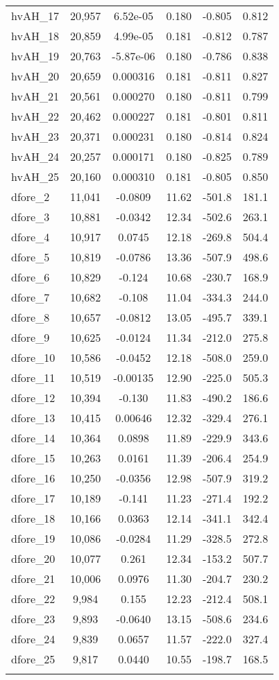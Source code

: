 \begin{tabular}{lccccc}
hvAH\_17 & 20,957 & 6.52e-05 & 0.180 & -0.805 & 0.812 \\
hvAH\_18 & 20,859 & 4.99e-05 & 0.181 & -0.812 & 0.787 \\
hvAH\_19 & 20,763 & -5.87e-06 & 0.180 & -0.786 & 0.838 \\
hvAH\_20 & 20,659 & 0.000316 & 0.181 & -0.811 & 0.827 \\
hvAH\_21 & 20,561 & 0.000270 & 0.180 & -0.811 & 0.799 \\
hvAH\_22 & 20,462 & 0.000227 & 0.181 & -0.801 & 0.811 \\
hvAH\_23 & 20,371 & 0.000231 & 0.180 & -0.814 & 0.824 \\
hvAH\_24 & 20,257 & 0.000171 & 0.180 & -0.825 & 0.789 \\
hvAH\_25 & 20,160 & 0.000310 & 0.181 & -0.805 & 0.850 \\
dfore\_2 & 11,041 & -0.0809 & 11.62 & -501.8 & 181.1 \\
dfore\_3 & 10,881 & -0.0342 & 12.34 & -502.6 & 263.1 \\
dfore\_4 & 10,917 & 0.0745 & 12.18 & -269.8 & 504.4 \\
dfore\_5 & 10,819 & -0.0786 & 13.36 & -507.9 & 498.6 \\
dfore\_6 & 10,829 & -0.124 & 10.68 & -230.7 & 168.9 \\
dfore\_7 & 10,682 & -0.108 & 11.04 & -334.3 & 244.0 \\
dfore\_8 & 10,657 & -0.0812 & 13.05 & -495.7 & 339.1 \\
dfore\_9 & 10,625 & -0.0124 & 11.34 & -212.0 & 275.8 \\
dfore\_10 & 10,586 & -0.0452 & 12.18 & -508.0 & 259.0 \\
dfore\_11 & 10,519 & -0.00135 & 12.90 & -225.0 & 505.3 \\
dfore\_12 & 10,394 & -0.130 & 11.83 & -490.2 & 186.6 \\
dfore\_13 & 10,415 & 0.00646 & 12.32 & -329.4 & 276.1 \\
dfore\_14 & 10,364 & 0.0898 & 11.89 & -229.9 & 343.6 \\
dfore\_15 & 10,263 & 0.0161 & 11.39 & -206.4 & 254.9 \\
dfore\_16 & 10,250 & -0.0356 & 12.98 & -507.9 & 319.2 \\
dfore\_17 & 10,189 & -0.141 & 11.23 & -271.4 & 192.2 \\
dfore\_18 & 10,166 & 0.0363 & 12.14 & -341.1 & 342.4 \\
dfore\_19 & 10,086 & -0.0284 & 11.29 & -328.5 & 272.8 \\
dfore\_20 & 10,077 & 0.261 & 12.34 & -153.2 & 507.7 \\
dfore\_21 & 10,006 & 0.0976 & 11.30 & -204.7 & 230.2 \\
dfore\_22 & 9,984 & 0.155 & 12.23 & -212.4 & 508.1 \\
dfore\_23 & 9,893 & -0.0640 & 13.15 & -508.6 & 234.6 \\
dfore\_24 & 9,839 & 0.0657 & 11.57 & -222.0 & 327.4 \\
dfore\_25 & 9,817 & 0.0440 & 10.55 & -198.7 & 168.5 \\
 &  &  &  &  &  \\ \hline
\end{tabular}
